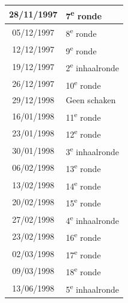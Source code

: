 \documentclass[a4paper]{scrreprt}
\begin{document}
\begin{landscape}
\begin{center}
\begin{tabular}{ c l }
    28/11/1997 & 7\textsuperscript{e} ronde \\
    \hline
\rowcolor{headingkleur!25}
    05/12/1997 & 8\textsuperscript{e} ronde \\
    \hline
\rowcolor{headingkleur!25}
    12/12/1997 & 9\textsuperscript{e} ronde \\
    \hline
\rowcolor{headingkleur!10}
    19/12/1997 & 2\textsuperscript{e} inhaalronde \\
    \hline
\rowcolor{headingkleur!25}
    26/12/1997 & 10\textsuperscript{e} ronde \\
    \hline
    29/12/1998 & Geen schaken \\
    \hline
\rowcolor{headingkleur!25}
    16/01/1998 & 11\textsuperscript{e} ronde \\
    \hline
\rowcolor{headingkleur!25}
    23/01/1998 & 12\textsuperscript{e} ronde \\
    \hline
\rowcolor{headingkleur!10}
    30/01/1998 & 3\textsuperscript{e} inhaalronde \\
    \hline
\rowcolor{headingkleur!25}
    06/02/1998 & 13\textsuperscript{e} ronde \\
    \hline
\rowcolor{headingkleur!25}
    13/02/1998 & 14\textsuperscript{e} ronde \\
    \hline
\rowcolor{headingkleur!25}
    20/02/1998 & 15\textsuperscript{e} ronde \\
    \hline
\rowcolor{headingkleur!10}
    27/02/1998 & 4\textsuperscript{e} inhaalronde \\
    \hline
\rowcolor{headingkleur!25}
    23/02/1998 & 16\textsuperscript{e} ronde \\
    \hline
\rowcolor{headingkleur!25}
    02/03/1998 & 17\textsuperscript{e} ronde \\
    \hline
\rowcolor{headingkleur!25}
    09/03/1998 & 18\textsuperscript{e} ronde \\
    \hline
\rowcolor{headingkleur!10}
    13/06/1998 & 5\textsuperscript{e} inhaalronde \\
    \hline
   \end{tabular}
  \end{center}
 \end{landscape}
\end{document}
